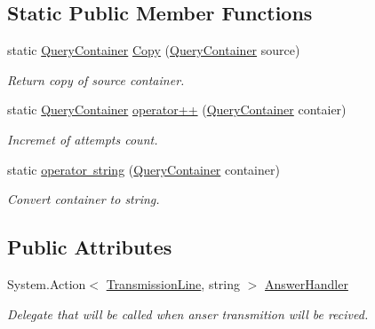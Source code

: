 \subsection*{Static Public Member Functions}
\begin{DoxyCompactItemize}
\item 
static \mbox{\hyperlink{struct_pipes_provider_1_1_client_1_1_query_container}{Query\+Container}} \mbox{\hyperlink{struct_pipes_provider_1_1_client_1_1_query_container_acfcd11bf7f6b6c9cc4e6b2ff574437bd}{Copy}} (\mbox{\hyperlink{struct_pipes_provider_1_1_client_1_1_query_container}{Query\+Container}} source)
\begin{DoxyCompactList}\small\item\em Return copy of source container. \end{DoxyCompactList}\item 
static \mbox{\hyperlink{struct_pipes_provider_1_1_client_1_1_query_container}{Query\+Container}} \mbox{\hyperlink{struct_pipes_provider_1_1_client_1_1_query_container_a9a97cf832c6736f14f5ed2661fbb3bce}{operator++}} (\mbox{\hyperlink{struct_pipes_provider_1_1_client_1_1_query_container}{Query\+Container}} contaier)
\begin{DoxyCompactList}\small\item\em Incremet of attempts count. \end{DoxyCompactList}\item 
static \mbox{\hyperlink{struct_pipes_provider_1_1_client_1_1_query_container_a0d227c39b9ecec5d8b3e739e87e171a6}{operator string}} (\mbox{\hyperlink{struct_pipes_provider_1_1_client_1_1_query_container}{Query\+Container}} container)
\begin{DoxyCompactList}\small\item\em Convert container to string. \end{DoxyCompactList}\end{DoxyCompactItemize}
\subsection*{Public Attributes}
\begin{DoxyCompactItemize}
\item 
System.\+Action$<$ \mbox{\hyperlink{class_pipes_provider_1_1_client_1_1_transmission_line}{Transmission\+Line}}, string $>$ \mbox{\hyperlink{struct_pipes_provider_1_1_client_1_1_query_container_acaaa09658d3bb75118670fbb90b77f33}{Answer\+Handler}}
\begin{DoxyCompactList}\small\item\em Delegate that will be called when anser transmition will be recived. \end{DoxyCompactList}\end{DoxyCompactItemize}
